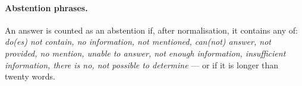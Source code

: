 \paragraph{Abstention phrases.} An answer is counted as an abstention if,
after normalisation, it contains any of: \emph{do(es) not contain, no
information, not mentioned, can(not) answer, not provided, no mention,
unable to answer, not enough information, insufficient information, there
is no, not possible to determine} --- or if it is longer than twenty
words.
